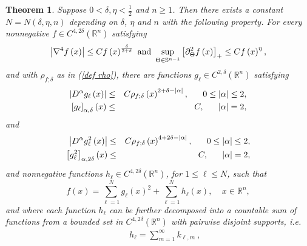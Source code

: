 \documentclass{amsart}
\newtheorem{theorem}{Theorem}[section]
\theoremstyle{plain}
\numberwithin{equation}{section}
\begin{document}
\begin{theorem}
\label{provisional}Suppose $0<\delta ,\eta <\frac{1}{2}$ and $n\geq 1$. Then
there exists a constant $N=N\left( \delta ,\eta ,n\right) $ depending on $%
\delta $, $\eta $ and $n$ with the following property. For every nonnegative 
$f\in C^{4,2\delta }\left( \mathbb{R}^{n}\right) $ satisfying%
\begin{equation}
\left\vert \nabla ^{4}f\left( x\right) \right\vert \leq Cf\left( x\right) ^{%
\frac{\delta }{2+\delta }}\text{ and }\sup_{\Theta \in \mathbb{S}^{n-1}}%
\left[ \partial _{\Theta }^{2}f\left( x\right) \right] _{+}\leq Cf\left(
x\right) ^{\eta },  \label{diff prov}
\end{equation}%
and with $\rho _{f;\delta }$ as in (\ref{def rho}), there are functions $%
g_{\ell }\in C^{2,\delta }\left( \mathbb{R}^{n}\right) $ satisfying%
\begin{eqnarray}
\left\vert D^{\alpha }g_{\ell }\left( x\right) \right\vert  &\leq &C\rho
_{f;\delta }\left( x\right) ^{2+\delta -\left\vert \alpha \right\vert },\ \
\ \ \ 0\leq \left\vert \alpha \right\vert \leq 2,  \label{Dg delta} \\
\left[ g_{\ell }\right] _{\alpha ,\delta }\left( x\right)  &\leq &C,\ \ \ \
\ \left\vert \alpha \right\vert =2,  \notag
\end{eqnarray}%
and%
\begin{eqnarray}
\left\vert D^{\alpha }g_{\ell }^{2}\left( x\right) \right\vert  &\leq &C\rho
_{f;\delta }\left( x\right) ^{4+2\delta -\left\vert \alpha \right\vert },\ \
\ \ \ 0\leq \left\vert \alpha \right\vert \leq 2,  \label{Dg^2 delta} \\
\left[ g_{\ell }^{2}\right] _{\alpha ,2\delta }\left( x\right)  &\leq &C,\ \
\ \ \ \left\vert \alpha \right\vert =2,  \notag
\end{eqnarray}%
and nonnegative functions $h_{\ell }\in C^{4,2\delta }\left( \mathbb{R}%
^{n}\right) $, for $1\leq \ell \leq N$, such that 
\begin{equation*}
f\left( x\right) =\sum_{\ell =1}^{N}g_{\ell }\left( x\right) ^{2}+\sum_{\ell
=1}^{N}h_{\ell }\left( x\right) ,\ \ \ \ \ x\in \mathbb{R}^{n},
\end{equation*}%
and where each function $h_{\ell }$ can be further decomposed into a
countable sum of functions from a bounded set in $C^{4,2\delta }\left( 
\mathbb{R}^{n}\right) $ with pairwise disjoint supports, i.e. 
\begin{eqnarray}
&&h_{\ell }=\sum_{m=1}^{\infty }k_{\ell ,m}\ ,  \label{special} \\

\end{eqnarray}
\end{theorem}
\end{document}
